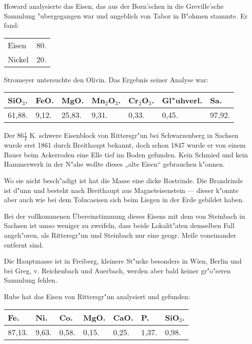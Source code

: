 \documentclass[a4paper, 11pt, oneside]{article}
\begin{document}
Howard analysierte das Eisen, das aus der Born'schen in die Greville'sche Sammlung "ubergegangen war und angeblich von Tabor in B"ohmen stammte. Er fand:
\begin{table}[H]
    \centering
    \begin{tabular}{l r}
        Eisen & 80. \\
        Nickel & 20. \\
    \end{tabular}
\end{table}

Stromeyer untersuchte den Olivin. Das Ergebnis seiner Analyse war:
\begin{table}[H]
    \centering
    \begin{tabular}{l l l l l l l}
        SiO$_{3}$. & FeO. & MgO. & Mn$_{2}$O$_{3}$. & Cr$_{2}$O$_{3}$. & Gl"uhverl. & Sa. \\ \hline
        61,88. & 9,12. & 25,83. & 9,31. & 0,33. & 0,45. & 97,92. \\
    \end{tabular}
\end{table}

Der $86\frac{1}{2}$ K. schwere Eisenblock von Rittersgr"un bei Schwarzenberg in Sachsen wurde erst 1861 durch Breithaupt bekannt, doch schon 1847 wurde er von einem Bauer beim Ackerroden eine Elle tief im Boden gefunden. Kein Schmied und kein Hammerwerk in der N"ahe wollte dieses „alte Eisen“ gebrauchen k"onnen.

Wo sie nicht besch"adigt ist hat die Masse eine dicke Rostrinde. Die Brandrinde ist d"unn und besteht nach Breithaupt aus Magneteisenstein --- dieser k"onnte aber auch wie bei dem Tolucaeisen sich beim Liegen in der Erde gebildet haben.

Bei der vollkommenen Übereinstimmung dieses Eisens mit dem von Steinbach in Sachsen ist umso weniger zu zweifeln, dass beide Lokalit"aten demselben Fall angeh"oren, als Rittersgr"un und Steinbach nur eine geogr. Meile voneinander entfernt sind.

Die Hauptmasse ist in Freiberg, kleinere St"ucke besonders in Wien, Berlin und bei Greg, v. Reichenbach und Auerbach, werden aber bald keiner gr"o"seren Sammlung fehlen.

Rube hat das Eisen von Rittersgr"un analysiert und gefunden:
\begin{table}[H]
    \centering
    \begin{tabular}{l l l l l l l}
        Fe. & Ni. & Co. & MgO. & CaO. & P. & SiO$_{3}$. \\ \hline
        87,13. & 9,63. & 0,58. & 0,15. & 0,25. & 1,37. & 0,98. \\
    \end{tabular}
\end{table}
\end{document}
